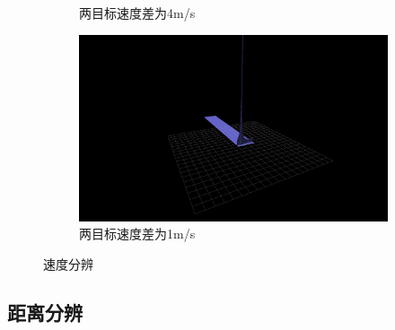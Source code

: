 \documentclass{article}
\newcounter{sub}
\begin{document}
\begin{figure}[H]
\begin{subfigure}[H]{.45\linewidth}
		\caption{两目标速度差为4m/s}
		\label{fig:两目标速度差为4m/s}
	\end{subfigure}
	\quad
	\begin{subfigure}[H]{.45\linewidth}
		\centering
		\includegraphics[width=\linewidth]{vector1-MTD-software.png}
		\caption{两目标速度差为1m/s}
		\label{fig:两目标速度差为1m/s}
	\end{subfigure}
	\caption{速度分辨}
	\label{fig:速度分辨}
\end{figure}

\subsection{距离分辨}%
\label{sub:距离分辨}
\end{document}
